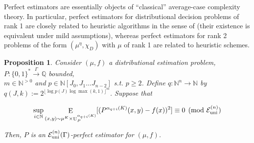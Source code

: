 \documentclass{article}
\numberwithin{equation}{section}
\theoremstyle{definition}
\theoremstyle{plain}
\newtheorem{proposition}{Proposition}[section]
\newcommand{\Bool}{\{0,1\}}
\newcommand{\Words}{{\Bool^*}}
\DeclareMathOperator{\E}{E}
\DeclareMathOperator{\Un}{U}
\newcommand{\Nats}{\mathbb{N}}
\newcommand{\Rats}{\mathbb{Q}}
\newcommand{\NatPolyJ}{\Nats[J_0, J_1 \ldots J_{n-2}]}
\newcommand{\NatFun}{\Nats^n \rightarrow}
\newcommand{\Floor}[1]{\lfloor #1 \rfloor}
\newcommand{\Fall}{\mathcal{E}}
\newcommand{\FallU}{{\Fall_{\textnormal{uni}}^{(n)}}}
\newcommand{\Scheme}{\xrightarrow{\Gamma}}
\begin{document}
Perfect estimators are essentially objects of \enquote{classical} average-case complexity theory. In particular, perfect estimators for distributional decision problems of rank 1 are closely related to heuristic algorithms in the sense of \cite{Bogdanov_2006} (their existence is equivalent under mild assumptions), whereas perfect estimators for rank 2 problems of the form ${(\mu^\eta,\chi_D)}$ with ${\mu}$ of rank 1 are related to heuristic schemes.

\begin{samepage}
\begin{proposition}
\label{prp:fall_uni_qpoly}
Consider ${(\mu,f)}$ a distributional estimation problem, ${P: \Words \Scheme \Rats}$ bounded,\\ $m \in \Nats^{>0}$ and ${p \in \NatPolyJ}$ s.t. ${p \geq 2}$. Define ${q: \NatFun \Nats}$ by ${q(J,k):=2^{\Floor{\log p(J)\log \max(k,1)}^m}}$. Suppose that 

\begin{equation}
\label{eqn:prp__fall_uni_qpoly}
\sup_{i \in \Nats} \E_{(x,y) \sim \mu^K \times \Un_P^{\alpha_{q+i}(K)}}[(P^{\alpha_{q+i}(K)}(x,y)-f(x))^2] \equiv 0 \pmod \FallU
\end{equation}

Then, ${P}$ is an ${\FallU(\Gamma)}$-perfect estimator for ${(\mu,f)}$.

\end{proposition}
\end{samepage}
\end{document}
